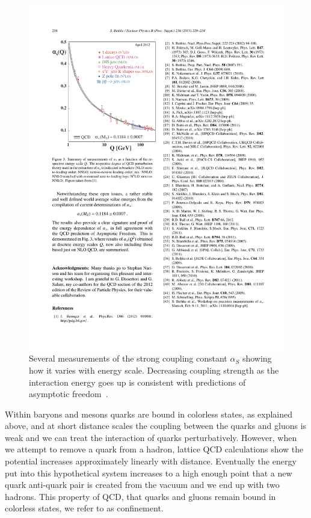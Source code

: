 \begin{figure}[htbp]
\begin{center}
\includegraphics[scale=1.3]{Plots/Intro/asymp_free.pdf}
\end{center}
\caption[Asymptotic Freedom]{Several measurements of the strong coupling constant $\alpha_S$ showing how it varies with energy scale. Decreasing coupling strength as the interaction energy goes up is consistent with predictions of asymptotic freedom~\cite{wsalpha}.}
\label{fig:a_free}
\end{figure}

Within baryons and mesons quarks are bound in colorless states, as explained above, and at short distance scales the coupling between the quarks and gluons is weak and we can treat the interaction of quarks perturbatively. However, when we attempt to remove a quark from a hadron, lattice QCD calculations show the potential increases approximately linearly with distance. Eventually the energy put into this hypothetical system increases to a high enough point that a new quark anti-quark pair is created from the vacuum and we end up with two hadrons. This property of QCD, that quarks and gluons remain bound in colorless states, we refer to as confinement. 

